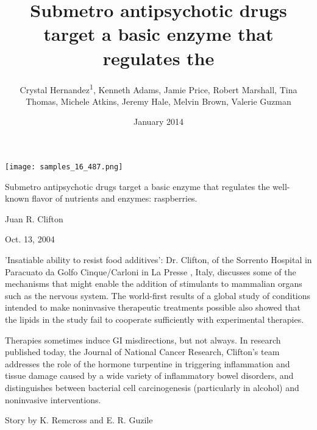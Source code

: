 \documentclass{article}
\title{Submetro antipsychotic drugs target a basic enzyme that regulates the}
\author{Crystal Hernandez\textsuperscript{1},  Kenneth Adams,  Jamie Price,  Robert Marshall,  Tina Thomas,  Michele Atkins,  Jeremy Hale,  Melvin Brown,  Valerie Guzman}
\affil{\textsuperscript{1}Yale University School of Medicine}
\date{January 2014}
\begin{document}
\maketitle

\begin{center}
\begin{minipage}{0.75\linewidth}
\texttt{[image: samples\_16\_487.png]}
\end{minipage}
\end{center}

Submetro antipsychotic drugs target a basic enzyme that regulates the well-known flavor of nutrients and enzymes: raspberries.

Juan R. Clifton

Oct. 13, 2004

'Insatiable ability to resist food additives': Dr. Clifton, of the Sorrento Hospital in Paracuato da Golfo Cinque/Carloni in La Presse , Italy, discusses some of the mechanisms that might enable the addition of stimulants to mammalian organs such as the nervous system. The world-first results of a global study of conditions intended to make noninvasive therapeutic treatments possible also showed that the lipids in the study fail to cooperate sufficiently with experimental therapies.

Therapies sometimes induce GI misdirections, but not always. In research published today, the Journal of National Cancer Research, Clifton's team addresses the role of the hormone turpentine in triggering inflammation and tissue damage caused by a wide variety of inflammatory bowel disorders, and distinguishes between bacterial cell carcinogenesis (particularly in alcohol) and noninvasive interventions.

Story by K. Remcross and E. R. Guzile
\end{document}
